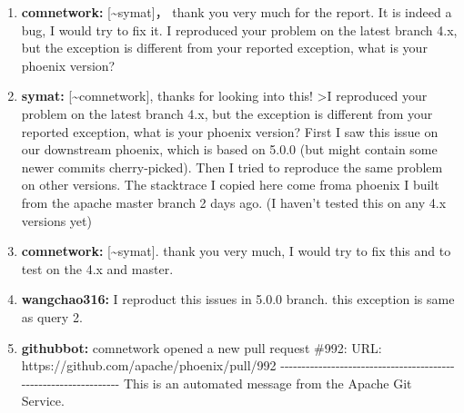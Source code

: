 \documentclass{report}%
\begin{document}
\begin{enumerate}%
\item%
\textbf{comnetwork: }{[}\textasciitilde{}symat{]}， thank you very much for the report.  It  is indeed a bug, I would try to fix it.\newline%
\newline%
I reproduced your problem on the latest branch 4.x, but the exception is different from your reported exception, what is your phoenix version? %
\item%
\textbf{symat: }{[}\textasciitilde{}comnetwork{]}, thanks for looking into this!\newline%
\newline%
\newline%
\newline%
>I reproduced your problem on the latest branch 4.x, but the exception is different from your reported exception, what is your phoenix version?\newline%
\newline%
\newline%
\newline%
First I saw this issue on our downstream phoenix, which is based on 5.0.0 (but might contain some newer commits cherry{-}picked). Then I tried to reproduce the same problem on other versions. The stacktrace I copied here come froma phoenix I built from the apache master branch 2 days ago. (I haven't tested this on any 4.x versions yet)%
\item%
\textbf{comnetwork: }{[}\textasciitilde{}symat{]}. thank you very much, I would try to fix this and to test   on the 4.x and master.%
\item%
\textbf{wangchao316: }I reproduct this issues in 5.0.0 branch. this exception is same as query 2.%
\item%
\textbf{githubbot: }comnetwork opened a new pull request \#992:\newline%
URL: https://github.com/apache/phoenix/pull/992\newline%
\newline%
\newline%
  \newline%
\newline%
{-}{-}{-}{-}{-}{-}{-}{-}{-}{-}{-}{-}{-}{-}{-}{-}{-}{-}{-}{-}{-}{-}{-}{-}{-}{-}{-}{-}{-}{-}{-}{-}{-}{-}{-}{-}{-}{-}{-}{-}{-}{-}{-}{-}{-}{-}{-}{-}{-}{-}{-}{-}{-}{-}{-}{-}{-}{-}{-}{-}{-}{-}{-}{-}\newline%
This is an automated message from the Apache Git Service.\newline%

\end{enumerate}
\end{document}
